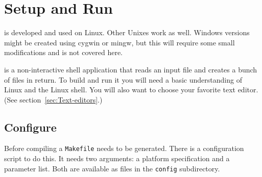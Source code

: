 \section{Setup and Run}

\ccarat{} is developed and used on Linux. Other Unixes work as well.
Windows versions might be created using cygwin or mingw, but this
will require some small modifications and is not covered here.

\ccarat{} is a non-interactive shell application that reads an input
file and creates a bunch of files in return. To build and run it you
will need a basic understanding of Linux and the Linux shell. You
will also want to choose your favorite text editor. (See section~\ref{sec:Text-editors}.)


\subsection{Configure}

Before compiling a \texttt{Makefile} needs to be generated. There
is a configuration script to do this. It needs two arguments: a platform
specification and a parameter list. Both are available as files in
the \texttt{config} subdirectory. 

